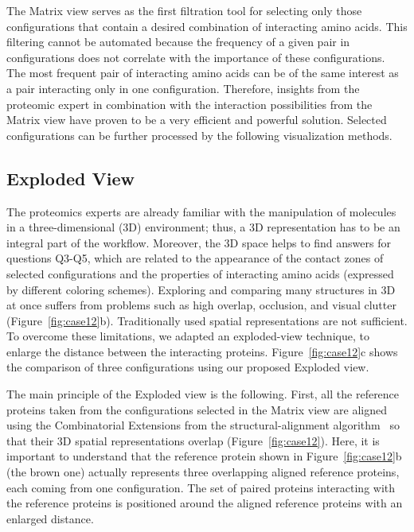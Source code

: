 \documentclass{bmcart}
\def\ExpView {Exploded view\xspace}
\def\MatView {Matrix view\xspace}
\begin{document}
The \MatView serves as the first filtration tool for selecting only those configurations that contain a desired combination of interacting amino acids.
This filtering cannot be automated because the frequency of a given pair in configurations does not correlate with the importance of these configurations.
The most frequent pair of interacting amino acids can be of the same interest as a pair interacting only in one configuration.
Therefore, insights from the proteomic expert in combination with the interaction possibilities from the \MatView have proven to be a very efficient and powerful solution.
Selected configurations can be further processed by the following visualization methods.



\subsection*{Exploded View}
The proteomics experts are already familiar with the manipulation of molecules in a three-dimensional (3D) environment; thus, a 3D representation has to be an integral part of the workflow.
Moreover, the 3D space helps to find answers for questions Q3-Q5, which are related to the appearance of the contact zones of selected configurations and the properties of interacting amino acids (expressed by different coloring schemes).
Exploring and comparing many structures in 3D at once suffers from problems such as high overlap, occlusion, and visual clutter (Figure~\ref{fig:case12}b). 
Traditionally used spatial representations are not sufficient.
To overcome these limitations, we adapted an exploded-view technique, to enlarge the distance between the interacting proteins. 
Figure~\ref{fig:case12}c shows the comparison of three configurations using our proposed \ExpView.

The main principle of the \ExpView is the following.
First, all the reference proteins taken from the configurations selected in the \MatView are aligned using the Combinatorial Extensions from the structural-alignment algorithm~\cite{Shindyalov1998} so that their 3D spatial representations overlap (Figure~\ref{fig:case12}). 
Here, it is important to understand that the reference protein shown in Figure~\ref{fig:case12}b (the brown one) actually represents three overlapping aligned reference proteins, each coming from one configuration.
The set of paired proteins interacting with the reference proteins is positioned around the aligned reference proteins with an enlarged distance.
\end{document}
